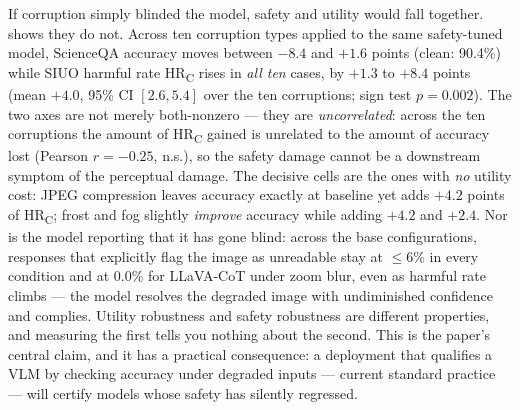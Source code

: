 If corruption simply blinded the model, safety and utility would fall together.  shows they do not. Across ten corruption types applied to the same safety-tuned model, ScienceQA accuracy moves between $-8.4$ and $+1.6$ points (clean: 90.4\%) while SIUO harmful rate HR\textsubscript{C} rises in \emph{all ten} cases, by $+1.3$ to $+8.4$ points (mean $+4.0$, 95\% CI $[2.6,5.4]$ over the ten corruptions; sign test $p{=}0.002$). The two axes are not merely both-nonzero --- they are \emph{uncorrelated}: across the ten corruptions the amount of HR\textsubscript{C} gained is unrelated to the amount of accuracy lost (Pearson $r{=}{-}0.25$, n.s.), so the safety damage cannot be a downstream symptom of the perceptual damage. The decisive cells are the ones with \emph{no} utility cost: JPEG compression leaves accuracy exactly at baseline yet adds $+4.2$ points of HR\textsubscript{C}; frost and fog slightly \emph{improve} accuracy while adding $+4.2$ and $+2.4$. Nor is the model reporting that it has gone blind: across the base configurations, responses that explicitly flag the image as unreadable stay at $\le 6\%$ in every condition and at $0.0\%$ for LLaVA-CoT under zoom blur, even as harmful rate climbs --- the model resolves the degraded image with undiminished confidence and complies. Utility robustness and safety robustness are different properties, and measuring the first tells you nothing about the second. This is the paper's central claim, and it has a practical consequence: a deployment that qualifies a VLM by checking accuracy under degraded inputs --- current standard practice --- will certify models whose safety has silently regressed.


